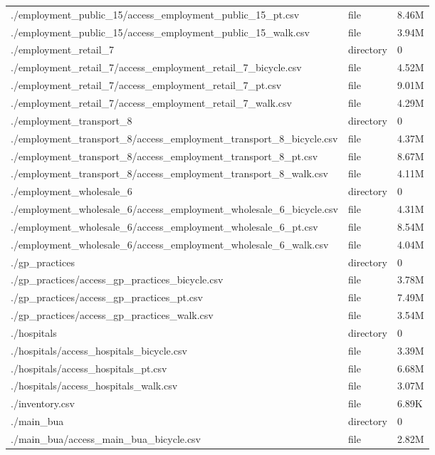 \documentclass{article}
\begin{document}
\begin{longtable}[t]{>{\raggedright\arraybackslash}p{13cm}ll}
./employment\_public\_15/access\_employment\_public\_15\_pt.csv & file & 8.46M\\
./employment\_public\_15/access\_employment\_public\_15\_walk.csv & file & 3.94M\\
./employment\_retail\_7 & directory & 0\\
\addlinespace
./employment\_retail\_7/access\_employment\_retail\_7\_bicycle.csv & file & 4.52M\\
./employment\_retail\_7/access\_employment\_retail\_7\_pt.csv & file & 9.01M\\
./employment\_retail\_7/access\_employment\_retail\_7\_walk.csv & file & 4.29M\\
./employment\_transport\_8 & directory & 0\\
./employment\_transport\_8/access\_employment\_transport\_8\_bicycle.csv & file & 4.37M\\
\addlinespace
./employment\_transport\_8/access\_employment\_transport\_8\_pt.csv & file & 8.67M\\
./employment\_transport\_8/access\_employment\_transport\_8\_walk.csv & file & 4.11M\\
./employment\_wholesale\_6 & directory & 0\\
./employment\_wholesale\_6/access\_employment\_wholesale\_6\_bicycle.csv & file & 4.31M\\
./employment\_wholesale\_6/access\_employment\_wholesale\_6\_pt.csv & file & 8.54M\\
\addlinespace
./employment\_wholesale\_6/access\_employment\_wholesale\_6\_walk.csv & file & 4.04M\\
./gp\_practices & directory & 0\\
./gp\_practices/access\_gp\_practices\_bicycle.csv & file & 3.78M\\
./gp\_practices/access\_gp\_practices\_pt.csv & file & 7.49M\\
./gp\_practices/access\_gp\_practices\_walk.csv & file & 3.54M\\
\addlinespace
./hospitals & directory & 0\\
./hospitals/access\_hospitals\_bicycle.csv & file & 3.39M\\
./hospitals/access\_hospitals\_pt.csv & file & 6.68M\\
./hospitals/access\_hospitals\_walk.csv & file & 3.07M\\
./inventory.csv & file & 6.89K\\
\addlinespace
./main\_bua & directory & 0\\
./main\_bua/access\_main\_bua\_bicycle.csv & file & 2.82M\\

\end{longtable}
\end{document}
